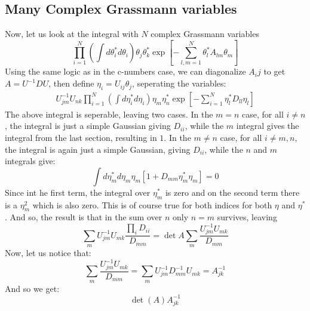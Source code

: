 \documentclass{article}
\begin{document}
\subsection{Many Complex Grassmann variables}
Now, let us look at the integral with $N$ complex Grassmann variables
\begin{equation}
    \prod_{i=1}^{N} \left(\int d\theta_i^* d\theta_i\right)\theta_j\theta_k^* \exp[-\sum_{l,m=1}^N \theta_l^*A_{lm}\theta_m]
\end{equation}
Using the same logic as in the c-numbers case, we can diagonalize $A_ij$ to get $A = U^{-1}DU$, then define $\eta_i = U_{ij}\theta_j$, seperating the variables:
\begin{equation}
\begin{gathered}
    U^{-1}_{jm}U_{nk}\prod_{i=1}^{N} \left(\int d\eta_i^* d\eta_i\right)\eta_m\eta_n^* 
    \exp[-\sum_{i=1}^N \eta_l^*D_{ll}\eta_l]
\end{gathered}
\end{equation}
The above integral is seperable, leaving two cases. In the $m = n$ case, for all $i \ne n$, the integral is just a simple Gaussian giving $D_{ii}$, while the $m$ integral gives the integral from the last section, resulting in $1$.
\newline
In the $m \ne n$ case, for all $i \ne m,n$, the integral is again just a simple Gaussian, giving $D_{ii}$, while the $n$ and $m$ integrals give:
\begin{equation}
    \int d\eta_m^*d\eta_m \eta_m[1 + D_{mm}\eta^*_m\eta_m] = 0
\end{equation}
Since int he first term, the integral over $\eta^*_m$ is zero and on the second term there is a $\eta_m^2$ which is also zero. This is of course true for both indices for both $\eta$ and $\eta^*$. And so, the result is that in the sum over $n$ only $n = m$ survives, leaving
\begin{equation}
        \sum_m U^{-1}_{jm}U_{mk}\frac{\prod_i D_{ii}}{D_{mm}} = \det A\sum_m\frac{U^{-1}_{jm}U_{mk}}{D_{mm}}
\end{equation}
Now, let us notice that:
\begin{equation}
    \sum_m\frac{U^{-1}_{jm}U_{mk}}{D_{mm}} = \sum_m U^{-1}_{jm}D_{mm}^{-1}U_{mk} = A^{-1}_{jk}
\end{equation}
And so we get:
\begin{equation}
    \det(A)A^{-1}_{jk}
\end{equation}
\end{document}
